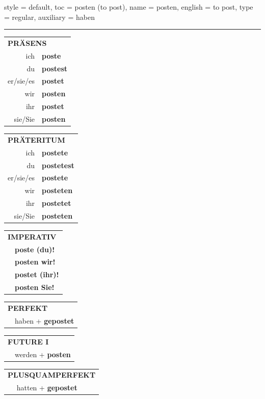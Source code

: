 \begin{verbentry}{
  style = {default},
  toc = {posten (to post)},
  name = {posten},
  english = {to post},
  type = {regular},
  auxiliary = {haben}
}
 

\vspace{5pt}
\hrule
\vspace{5pt}

\begin{tabular}{rl}
\multicolumn{2}{l}{\textbf{PRÄSENS}}\\
ich & \textbf{poste}\\
du & \textbf{postest}\\
er/sie/es & \textbf{postet}\\
wir & \textbf{posten}\\
ihr & \textbf{postet}\\
sie/Sie & \textbf{posten}\\
\end{tabular}
\hfill
\begin{tabular}{rl}
\multicolumn{2}{l}{\textbf{PRÄTERITUM}}\\
ich & \textbf{postete}\\
du & \textbf{postetest}\\
er/sie/es & \textbf{postete}\\
wir & \textbf{posteten}\\
ihr & \textbf{postetet}\\
sie/Sie & \textbf{posteten}\\
\end{tabular}
\hfill
\begin{tabular}{rl}
\multicolumn{2}{l}{\textbf{IMPERATIV}}\\
& \textbf{poste (du)!}\\
& \textbf{posten wir!}\\
& \textbf{postet (ihr)!}\\
& \textbf{posten Sie!}\\
\end{tabular}

\vspace{10pt}

\begin{tabular}{rl}
\multicolumn{2}{l}{\textbf{PERFEKT}}\\
& haben + \textbf{gepostet}\\
\end{tabular}
\hfill
\begin{tabular}{rl}
\multicolumn{2}{l}{\textbf{FUTURE I}}\\
& werden + \textbf{posten}\\
\end{tabular}
\hfill
\begin{tabular}{rl}
\multicolumn{2}{l}{\textbf{PLUSQUAMPERFEKT}}\\
& hatten + \textbf{gepostet}\\
\end{tabular}


\end{verbentry}
